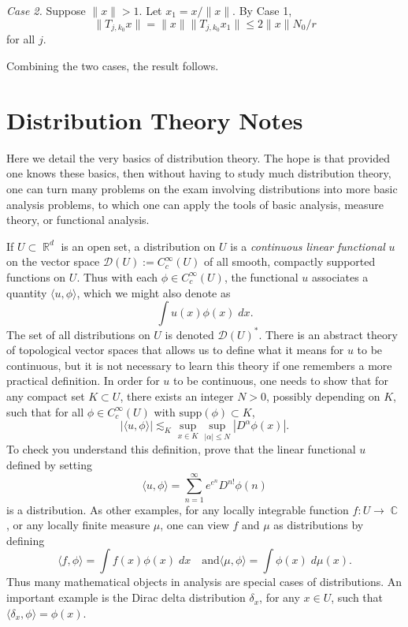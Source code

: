 \documentclass[answers]{exam}
\DeclareMathOperator{\CC}{\mathbb{C}}
\DeclareMathOperator{\RR}{\mathbb{R}}
\begin{document}
\begin{questions}
\begin{solution}
\textit{Case 2.} Suppose $\| x \|>1$. Let $x_1 = x/ \|x \|$. By Case 1,
\begin{equation*}
\| T_{j,k_0} x \| = \| x \| \| T_{j,k_0}x_1 \| \leq 2 \|x \|N_0/r
\end{equation*}
for all $j$. 

Combining the two cases, the result follows.
\end{solution}







\newpage
\section{Distribution Theory Notes}

Here we detail the very basics of distribution theory. The hope is that provided one knows these basics, then without having to study much distribution theory, one can turn many problems on the exam involving distributions into more basic analysis problems, to which one can apply the tools of basic analysis, measure theory, or functional analysis.

If $U \subset \RR^d$ is an open set, a distribution on $U$ is a \emph{continuous linear functional} $u$ on the vector space $\mathcal{D}(U) := C_c^\infty(U)$ of all smooth, compactly supported functions on $U$. Thus with each $\phi \in C_c^\infty(U)$, the functional $u$ associates a quantity $\langle u, \phi \rangle$, which we might also denote as
%
\[ \int u(x) \phi(x)\; dx. \]
%
The set of all distributions on $U$ is denoted $\mathcal{D}(U)^*$. There is an abstract theory of topological vector spaces that allows us to define what it means for $u$ to be continuous, but it is not necessary to learn this theory if one remembers a more practical definition. In order for $u$ to be continuous, one needs to show that for any compact set $K \subset U$, there exists an integer $N > 0$, possibly depending on $K$, such that for all $\phi \in C_c^\infty(U)$ with $\text{supp}(\phi) \subset K$,
%
\[ |\langle u, \phi \rangle| \lesssim_K \sup_{x \in K} \sup_{|\alpha| \leq N} |D^\alpha \phi(x)|. \]
%
To check you understand this definition, prove that the linear functional $u$ defined by setting
%
\[ \langle u, \phi \rangle = \sum_{n = 1}^\infty e^{e^{n}} D^{n!} \phi(n) \]
%
is a distribution. As other examples, for any locally integrable function $f: U \to \CC$, or any locally finite measure $\mu$, one can view $f$ and $\mu$ as distributions by defining
%
\[ \langle f, \phi \rangle = \int f(x) \phi(x)\; dx \quad\text{and} \langle \mu, \phi \rangle = \int \phi(x)\; d\mu(x). \]
%
Thus many mathematical objects in analysis are special cases of distributions. An important example is the Dirac delta distribution $\delta_x$, for any $x \in U$, such that $\langle \delta_x, \phi \rangle = \phi(x)$.


\end{questions}
\end{document}
